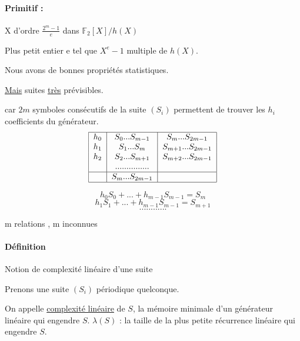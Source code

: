 \documentclass[12pt,a4paper]{article}
\begin{document}
	\paragraph{Primitif : }
		X d'ordre $\frac{2^m - 1}{e}$ dans $\mathbb{F}_2 [X]/h(X)$
		
		Plus petit entier e tel que
		$X^e - 1$ multiple de $h(X)$.
		
	Nous avons de bonnes propriétés statistiques.
	
	\underline{Mais} suites \underline{très} prévisibles.
	
	car $2m$ symboles consécutifs de la suite $(S_i)$ permettent de trouver les $h_i$ coefficients du générateur.
	\begin{displaymath}
\begin{tabular}{|c|c|c|}
  \hline
  $h_0$ & $S_0 ... S_{m-1}$ & $S_m ... S_{2m-1}$\\
  $h_1$ & $S_1 ... S_m$ & $S_{m+1} ...S_{2m-1}$ \\ 
  $h_2$ & $S_2 ... S_{m+1}$ & $S_{m+2}...S_{2m-1}$\\
  & $... ... ... ... ...$&\\ \hline
  & $S_m ... S_{2m-1}$&\\ \hline
\end{tabular}
		\end{displaymath}

	\begin{displaymath}
	h_0 S_0 + ... + h_{m-1} S_{m-1} = S_m
	\end{displaymath}
	\begin{displaymath}
	h_1 S_1 + ... + h_{m-1} S_{m-1} = S_{m+1}
	\end{displaymath}
	\begin{displaymath}
	... ... ... ...
	\end{displaymath}
	
	m relations , m inconnues
	
	\paragraph{Définition}
	Notion de complexité linéaire d'une suite
	
	Prenons une suite $(S_i)$ périodique quelconque.
	
	On appelle \underline{complexité linéaire} de $S$, la mémoire minimale d'un générateur linéaire qui engendre $S$. $\lambda (S)$ : la taille de la plus petite récurrence linéaire qui engendre $S$. 
	\\
	
\end{document}
